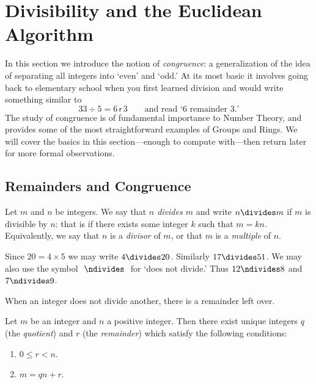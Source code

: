 \section{Divisibility and the Euclidean Algorithm}\label{sec:gcd}

\iffalse

In this section we introduce the notion of \emph{congruence}: a generalization of the idea of separating all integers into `even' and `odd.' At its most basic it involves going back to elementary school when you first learned division and would write something similar to
\[33\div 5=6\mathsf{\,r\,}3\qquad\text{and read `6 remainder 3.'}\]
The study of congruence is of fundamental importance to Number Theory, and provides some of the most straightforward examples of Groups and Rings. We will cover the basics in this section---enough to compute with---then return later for more formal observations.

\subsection{Remainders and Congruence}\label{sec:cong}

\begin{defn}\label{defn:div}
Let $m$ and $n$ be integers. We say that \emph{$n$ divides $m$} and write $n\divides m$ if $m$ is divisible by $n$: that is if there exists some integer $k$ such that $m=kn$. Equivalently, we say that $n$ is a \emph{divisor} of $m$, or that $m$ is a \emph{multiple} of $n$.
\end{defn}

\begin{exs}
Since $20=4\times 5$ we may write $4\divides 20$. Similarly $17\divides 51$. We may also use the symbol $\ \ndivides\ $ for `does not divide.' Thus $12\ndivides 8$ and $7\ndivides 9$.
\end{exs}

When an integer does not divide another, there is a remainder left over.

\begin{thm}\label{thm:div}
Let $m$ be an integer and $n$ a positive integer. Then there exist unique integers $q$ (the \emph{quotient}) and $r$ (the \emph{remainder}) which satisfy the following conditions:
\begin{enumerate}\setlength{\itemsep}{0pt}
  \item $0\le r<n$.
  \item $m=qn+r$.
\end{enumerate} 
\end{thm}

